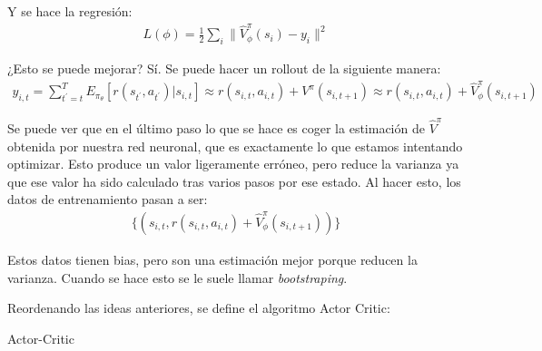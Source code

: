 Y se hace la regresión:
\begin{align}
L ( \phi ) = \frac { 1 } { 2 } \sum _ { i } \| \hat { V } _ { \phi } ^ { \pi } ( s _ { i } ) - y _ { i } \| ^ { 2 }
\end{align}

¿Esto se puede mejorar? Sí. Se puede hacer un rollout de la siguiente manera:
\begin{align}
y _ { i , t } = \sum _ { t ^ { \prime } = t } ^ { T } E _ { \pi _ { \theta } } [ r ( s _ { t ^ {
\prime } } , a _ { t ^ { \prime } } ) | s _ { i , t } ] \approx r ( s _ { i , t } , a _ { i , t }
) + V ^ { \pi } ( s _ { i , t + 1 } ) \approx r ( s _ { i , t } , a _ { i , t } ) + \hat { V } _
{ \phi } ^ { \pi } ( s _ { i , t + 1})
\end{align}

Se puede ver que en el último paso lo que se hace es coger la estimación de $\hat{V}^\pi$
obtenida por nuestra red neuronal, que es exactamente lo que estamos intentando
optimizar. Esto produce un valor ligeramente erróneo, pero reduce la varianza ya que ese
valor ha sido calculado tras varios pasos por ese estado. Al hacer esto, los datos de
entrenamiento pasan a ser:
\begin{align}
\{ ( s _ { i , t } , r ( s _ { i , t } , a _ { i , t } ) + \hat { V } _ { \phi } ^ { \pi } ( s _ { i , t + 1 } ) ) \}
\end{align}

Estos datos tienen bias, pero son una estimación mejor porque reducen la varianza. Cuando se
hace esto se le suele llamar \textit{bootstraping}.

Reordenando las ideas anteriores, se define el algoritmo Actor Critic:
\begin{algorithm}
    \caption{Actor-Critic}
    \label{alg:actor-critic}
\end{algorithm}

